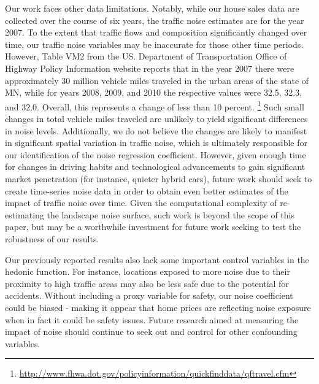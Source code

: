 \documentclass{article}\usepackage{graphicx, color}
\begin{document}
Our work faces other data limitations. Notably, while our house sales data are collected over the course of six years, the traffic noise estimates are for the year 2007. To the extent that traffic flows and composition significantly changed over time, our traffic noise variables may be inaccurate for those other time periods. However, Table VM2 from the US. Department of Transportation Office of Highway Policy Information website reports that in the year 2007 there were approximately 30 million vehicle miles traveled in the urban areas of the state of MN, while for years 2008, 2009, and 2010 the respective values were 32.5, 32.3, and 32.0. Overall, this represents a change of less than 10 percent. \footnote{\url{http://www.fhwa.dot.gov/policyinformation/quickfinddata/qftravel.cfm}} Such small changes in total vehicle miles traveled are unlikely to yield significant differences in noise levels. Additionally, we do not believe the changes are likely to manifest in significant spatial variation in traffic noise, which is ultimately responsible for our identification of the noise regression coefficient. However, given enough time for changes in driving habits and technological advancements to gain significant market penetration (for instance, quieter hybrid cars), future work should seek to create time-series noise data in order to obtain even better estimates of the impact of traffic noise over time. Given the computational complexity of re-estimating the landscape noise surface, such work is beyond the scope of this paper, but may be a worthwhile investment for future work seeking to test the robustness of our results.

Our previously reported results also lack some important control variables in the hedonic function. For instance, locations exposed to more noise due to their proximity to high traffic areas may also be less safe due to the potential for accidents. Without including a proxy variable for safety, our noise coefficient could be biased - making it appear that home prices are reflecting noise exposure when in fact it could be safety issues. Future research aimed at measuring the impact of noise should continue to seek out and control for other confounding variables. 
\end{document}

